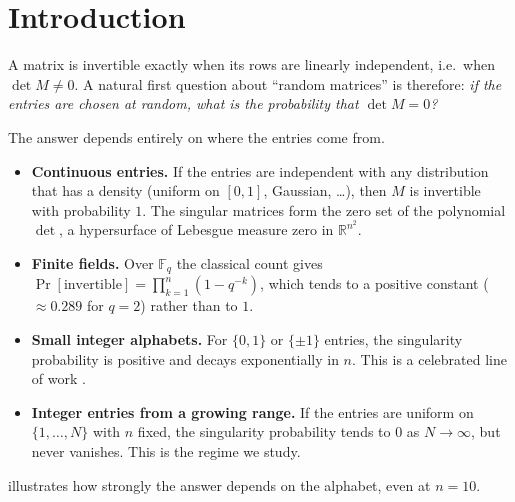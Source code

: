 \documentclass[11pt]{article}
\theoremstyle{definition}
\newcommand{\R}{\mathbb{R}}
\begin{document}
\tableofcontents
\bigskip

\section{Introduction}\label{sec:intro}

A matrix is invertible exactly when its rows are linearly independent, i.e.\ when $\det M\neq 0$. A natural first question about ``random matrices'' is therefore: \emph{if the entries are chosen at random, what is the probability that $\det M = 0$?}

The answer depends entirely on where the entries come from.

\begin{itemize}
\item \textbf{Continuous entries.} If the entries are independent with any distribution that has a density (uniform on $[0,1]$, Gaussian, \dots), then $M$ is invertible with probability $1$. The singular matrices form the zero set of the polynomial $\det$, a hypersurface of Lebesgue measure zero in $\R^{n^2}$.
\item \textbf{Finite fields.} Over $\mathbb{F}_q$ the classical count gives $\Pr[\text{invertible}]=\prod_{k=1}^{n}(1-q^{-k})$, which tends to a positive constant ($\approx 0.289$ for $q=2$) rather than to $1$.
\item \textbf{Small integer alphabets.} For $\{0,1\}$ or $\{\pm1\}$ entries, the singularity probability is positive and decays exponentially in $n$. This is a celebrated line of work \cite{Komlos,KKS,TaoVu,Tikhomirov,JSS}.
\item \textbf{Integer entries from a growing range.} If the entries are uniform on $\{1,\dots,N\}$ with $n$ fixed, the singularity probability tends to $0$ as $N\to\infty$, but never vanishes. This is the regime we study.
\end{itemize}

 illustrates how strongly the answer depends on the alphabet, even at $n=10$.
\end{document}

